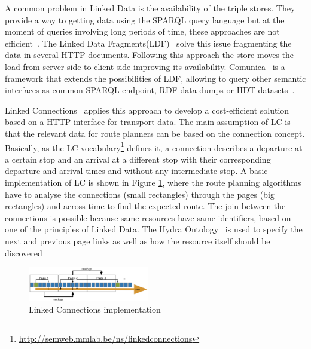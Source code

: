 \documentclass[sw]{iosart2x}
\begin{document}
	A common problem in Linked Data is the availability of the triple stores. They provide a way to getting data using the SPARQL query language but at the moment of queries involving long periods of time, these approaches are not efficient~\cite{verborgh2014querying}. The Linked Data Fragments(LDF)~\cite{verborgh2016triple,verborgh2014web} solve this issue fragmenting the data in several HTTP documents. Following this approach the store moves the load from server side to client side improving its availability. Comunica~\cite{taelman2018comunica} is a framework that extends the possibilities of LDF, allowing to query other semantic interfaces as common SPARQL endpoint, RDF data dumps or HDT datasets~\cite{fernandez2013binary}. 
	
	Linked Connections~\cite{colpaert2015intermodal} applies this approach to develop a cost-efficient solution based on a HTTP interface for transport data. The main assumption of LC is that the relevant data for route planners can be based on the connection concept. Basically, as the LC vocabulary\footnote{\url{http://semweb.mmlab.be/ns/linkedconnections}} defines it, a connection describes a departure at a certain stop and an arrival at a different stop with their corresponding departure and arrival times and without any intermediate stop. A basic implementation of LC is shown in Figure \ref{fig:lc_imp}, where the route planning algorithms have to analyse the connections (small rectangles) through the pages (big rectangles) and across time to find the expected route. The join between the connections is possible because same resources have same identifiers, based on one of the principles of Linked Data. The Hydra Ontology~\cite{lanthaler2013hydra} is used to specify the next and previous page links as well as how the resource itself should be discovered
	
	
	\begin{figure}[t]
		\includegraphics[width=0.47\textwidth]{images/implementation.png}
		\caption{Linked Connections implementation}\label{fig:lc_imp}
	\end{figure}
	
\end{document}
